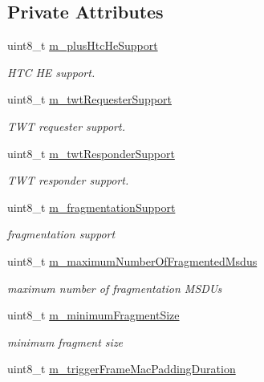 \subsection*{Private Attributes}
\begin{DoxyCompactItemize}
\item 
uint8\+\_\+t \hyperlink{classns3_1_1HeCapabilities_aa6a2ca2426a417f0bc5bc7680ec8b4c1}{m\+\_\+plus\+Htc\+He\+Support}
\begin{DoxyCompactList}\small\item\em H\+TC HE support. \end{DoxyCompactList}\item 
uint8\+\_\+t \hyperlink{classns3_1_1HeCapabilities_a382c23809a167949cec43da25c8f0608}{m\+\_\+twt\+Requester\+Support}
\begin{DoxyCompactList}\small\item\em T\+WT requester support. \end{DoxyCompactList}\item 
uint8\+\_\+t \hyperlink{classns3_1_1HeCapabilities_a8a734c713abb42b32e4078c761c605a8}{m\+\_\+twt\+Responder\+Support}
\begin{DoxyCompactList}\small\item\em T\+WT responder support. \end{DoxyCompactList}\item 
uint8\+\_\+t \hyperlink{classns3_1_1HeCapabilities_a84a70882f86c47a8d78ab0746978eb9f}{m\+\_\+fragmentation\+Support}
\begin{DoxyCompactList}\small\item\em fragmentation support \end{DoxyCompactList}\item 
uint8\+\_\+t \hyperlink{classns3_1_1HeCapabilities_a05c27329d2e963ea800201b5180ed4c5}{m\+\_\+maximum\+Number\+Of\+Fragmented\+Msdus}
\begin{DoxyCompactList}\small\item\em maximum number of fragmentation M\+S\+D\+Us \end{DoxyCompactList}\item 
uint8\+\_\+t \hyperlink{classns3_1_1HeCapabilities_a8a64ff2ed1cd3136fd8026c3562c9d9c}{m\+\_\+minimum\+Fragment\+Size}
\begin{DoxyCompactList}\small\item\em minimum fragment size \end{DoxyCompactList}\item 
uint8\+\_\+t \hyperlink{classns3_1_1HeCapabilities_a26cba20100867ce3dc4eff91ca93f326}{m\+\_\+trigger\+Frame\+Mac\+Padding\+Duration}

\end{DoxyCompactItemize}
